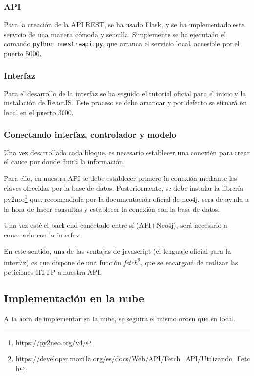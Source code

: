 \subsubsection{API}

Para la creación de la API REST, se ha usado Flask, y se ha implementado este servicio de una manera cómoda y sencilla. Simplemente se ha ejecutado el comando \texttt{python nuestraapi.py}, que arranca el servicio local, accesible por el puerto 5000\cite{flaskinstall}.

\subsubsection{Interfaz}

Para el desarrollo de la interfaz se ha seguido el tutorial oficial para el inicio y la instalación de ReactJS\cite{reactinstall}. Este proceso se debe arrancar y por defecto se situará en local en el puerto 3000.

\subsubsection{Conectando interfaz, controlador y modelo}

Una vez desarrollado cada bloque, es necesario establecer una conexión para crear el cauce por donde fluirá la información.

Para ello, en nuestra API se debe establecer primero la conexión mediante las claves ofrecidas por la base de datos\cite{connectflaskneo4j}. Posteriormente, se debe instalar la librería py2neo\footnote{https://py2neo.org/v4/} que, recomendada por la documentación oficial de neo4j, sera de ayuda a la hora de hacer consultas y establecer la conexión con la base de datos.

Una vez esté el back-end conectado entre sí (API+Neo4j), será necesario a conectarlo con la interfaz.

En este sentido, una de las ventajas de javascript (el lenguaje oficial para la interfaz) es que dispone de una función \textit{fetch}\footnote{https://developer.mozilla.org/es/docs/Web/API/Fetch\_API/Utilizando\_Fetch}, que se encargará de realizar las peticiones HTTP a nuestra API. 

\subsection{Implementación en la nube}

A la hora de implementar en la nube, se seguirá el mismo orden que en local. 

